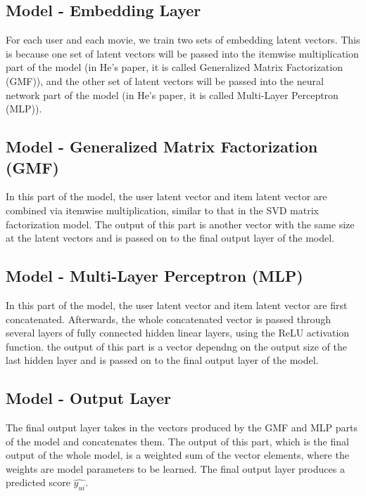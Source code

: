 \documentclass[final]{cvpr}
\begin{document}
\subsection{Model - Embedding Layer}

For each user and each movie, we train two sets of embedding latent vectors. This is because one set of latent
vectors will be passed into the itemwise multiplication part
of the model (in He’s paper, it is called Generalized Matrix
Factorization (GMF)), and the other set of latent vectors will
be passed into the neural network part of the model (in He’s
paper, it is called Multi-Layer Perceptron (MLP)).

\subsection{Model - Generalized Matrix Factorization (GMF)}

In this part of the model, the user latent vector and item latent vector are combined via itemwise multiplication, similar to that in the SVD matrix factorization model. The output of this part is another vector with the same size at the latent vectors and is passed on to the final output layer of the model.

\subsection{Model - Multi-Layer Perceptron (MLP)}

In this part of the model, the user latent vector and item latent vector are first concatenated. Afterwards, the whole concatenated vector is passed through several layers of fully connected hidden linear layers, using the ReLU activation function. the output of this part is a vector dependng on the output size of the last hidden layer and is passed on to the final output layer of the model.

\subsection{Model - Output Layer}

The final output layer takes in the vectors produced by the GMF and MLP parts of the model and concatenates them. The output of this part, which is the final output of the whole model, is a weighted sum of the vector elements, where the weights are model parameters to be learned. The final output layer produces a predicted score $\hat{y_{ui}}$.
\end{document}
